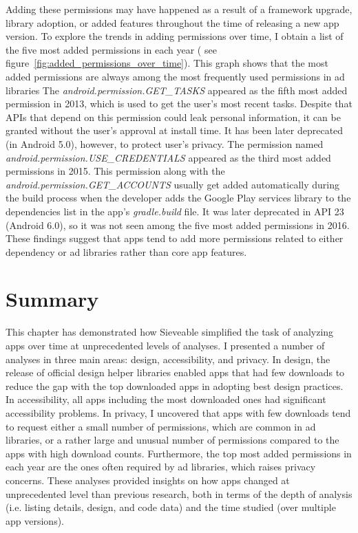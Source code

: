Adding these permissions may have happened as a result of a framework upgrade, library adoption, or added features throughout the time of releasing a new app version.
To explore the trends in adding permissions over time, I obtain a list of the five most added permissions in each year ( see figure~\ref{fig:added_permissions_over_time}).
This graph shows that the most added permissions are always among the most frequently used permissions in ad libraries \cite{Liu_2015_MobiSys}
The \textit{android.permission.GET\_TASKS} appeared as the fifth most added permission in 2013, which is used to get the user's most recent tasks.
Despite that APIs that depend on this permission could leak personal information, it can be granted without the user's approval at install time.
It has been later deprecated (in Android 5.0), however, to protect user's privacy.
The permission named \textit{android.permission.USE\_CREDENTIALS} appeared as the third most added permissions in 2015.
This permission along with the \textit{android.permission.GET\_ACCOUNTS} usually get added automatically during the build process when the developer adds the Google Play services library to the dependencies list in the app's \textit{gradle.build} file.
It was later deprecated in API 23 (Android 6.0), so it was not seen among the five most added permissions in 2016.
These findings suggest that apps tend to add more permissions related to either dependency or ad libraries rather than core app features.

\section{Summary}
This chapter has demonstrated how Sieveable simplified the task of analyzing apps over time at unprecedented levels of analyses.
I presented a number of analyses in three main areas: design, accessibility, and privacy.
In design, the release of official design helper libraries enabled apps that had few downloads to reduce the gap with the top downloaded apps in adopting best design practices.
In accessibility, all apps including the most downloaded ones had significant accessibility problems.
In privacy, I uncovered that apps with few downloads tend to request either a small number of permissions, which are common in ad libraries, or a rather large and unusual number of permissions compared to the apps with high download counts.
Furthermore, the top most added permissions in each year are the ones often required by ad libraries, which raises privacy concerns.
These analyses provided insights on how apps changed at unprecedented level than previous research, both in terms of the depth of analysis (i.e. listing details, design, and code data) and the time studied (over multiple app versions).